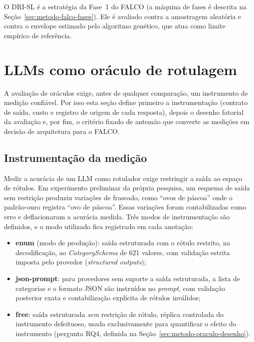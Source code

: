 O DRI-SL é a estratégia da Fase~1 do FALCO (a máquina de fases é descrita na
Seção~\ref{sec:metodo-falco-fases}). Ele é avaliado contra a amostragem
aleatória e contra o envelope estimado pelo algoritmo genético, que atua como
limite empírico de referência.

\section{LLMs como oráculo de rotulagem}
\label{sec:metodo-oraculo}

A avaliação de oráculos exige, antes de qualquer comparação, um instrumento
de medição confiável. Por isso esta seção define primeiro a instrumentação
(contrato de saída, custo e registro de origem de cada resposta), depois o desenho fatorial da
avaliação e, por fim, o critério fixado de antemão que converte as medições em decisão
de arquitetura para o FALCO.

\subsection{Instrumentação da medição}
\label{sec:metodo-oraculo-instrumentacao}

Medir a acurácia de um LLM como rotulador exige restringir a saída ao espaço de
rótulos. Em experimento preliminar da própria pesquisa, um esquema de saída sem
restrição produziu variações de fraseado, como ``ovos de páscoa'' onde o
padrão-ouro registra ``ovo de páscoa''. Essas variações foram contabilizadas
como erro e deflacionaram a acurácia medida. Três modos de instrumentação são definidos, e o modo utilizado
fica registrado em cada anotação:

\begin{itemize}
  \item \textbf{enum} (modo de produção): saída estruturada com o rótulo restrito,
  na decodificação, ao \textit{CategorySchema} de 621 valores, com validação
  estrita imposta pelo provedor (\textit{structured outputs});
  \item \textbf{json-prompt}: para provedores sem suporte a saída estruturada, a
  lista de categorias e o formato JSON são instruídos no \textit{prompt}, com
  validação posterior exata e contabilização explícita de rótulos inválidos;
  \item \textbf{free}: saída estruturada \emph{sem} restrição de rótulo, réplica
  controlada do instrumento defeituoso, usada exclusivamente para quantificar o
  efeito do instrumento (pergunta RQ4, definida na
  Seção~\ref{sec:metodo-oraculo-desenho}).
\end{itemize}

